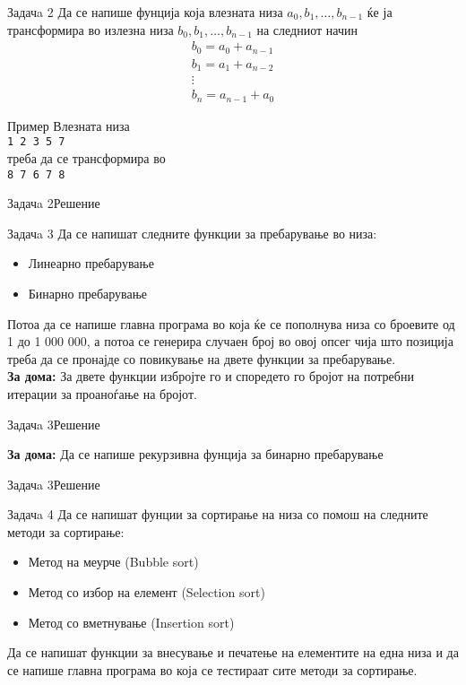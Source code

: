 \begin{frame}{Задачa 2}
Да се напише фунција која влезната низа $a_0, b_1, \ldots, b_{n-1}$ ќе ја
трансформира во излезна низа $b_0, b_1, \ldots, b_{n-1}$ на следниот
начин
\[
\begin{array}{l}
b_0 = a_0 + a_{n-1}\\
b_1 = a_1 + a_{n-2}\\
\vdots\\
b_n = a_{n-1} + a_{0}
\end{array}
\]
\begin{exampleblock}{Пример} 
Влезната низа\\
\texttt{1 2 3 5 7}\\
треба да се трансформира во\\
\texttt{8 7 6 7 8}
\end{exampleblock}
\end{frame}

\begin{frame}[fragile]{Задачa 2}{Решение} 

\end{frame}

\begin{frame}{Задачa 3}
Да се напишат следните функции за пребарување во низа:
\begin{itemize}
  \item Линеарно пребарување
  \item Бинарно пребарување
\end{itemize}  
Потоа да се напише главна програма во која ќе се пополнува низа со
броевите од 1 до 1 000 000, а потоа се генерира случаен број во овој опсег чија
што позиција треба да се пронајде со повикување на двете функции за
пребарување.\\
\textbf{За дома:} За двете функции избројте го и споредето го бројот на потребни
итерации за проаноѓање на бројот.
\end{frame}


\begin{frame}[fragile]{Задачa 3}{Решение}

\textbf{За дома:} Да се напише рекурзивна фунција за бинарно пребарување
\end{frame}

\begin{frame}[fragile]{Задачa 3}{Решение}

\end{frame}


\begin{frame}{Задачa 4}
Да се напишат фунции за сортирање на низа со помош на следните методи за
сортирање:
\begin{itemize}
  \item Метод на меурче (Bubble sort)
  \item Метод со избор на елемент (Selection sort)
  \item Метод со вметнување (Insertion sort)
\end{itemize}
Да се напишат функции за внесување и печатење на елементите на една низа и да се
напише главна програма во која се тестираат сите методи за сортирање.
\end{frame}

